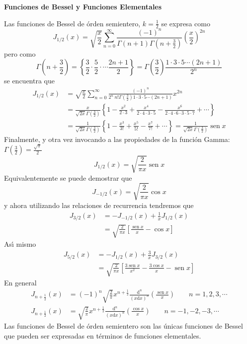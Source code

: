 \documentclass[spanish,notitlepage,letterpaper,12pt]{article}
\begin{document}
\begin{center}
\textbf{Funciones de Bessel y Funciones Elementales}
\end{center}

Las funciones de Bessel de \'{o}rden semientero, $k=\frac12$ se expresa como
\[
J_{1/2}(x)=\sqrt{\frac x2}\sum_{n=0}^{\infty}\frac{\left(  -1\right)  ^{n}%
}{\Gamma\left(  n+1\right)  \Gamma\left(  n+\frac32\right)  }\left(  \frac
x2\right)  ^{2n}
\]
pero como
\[
\Gamma\left(  n+\frac32\right)  =\left\{  \frac32\cdot\frac52\cdot\cdots
\frac{2n+1}2\right\}  =\Gamma\left(  \frac32\right)  \frac{1\cdot3\cdot
5\cdots\left(  2n+1\right)  }{2^{n}}
\]
se encuentra que
\begin{align*}
J_{1/2}(x)  & =\sqrt{\frac x2}\sum_{n=0}^{\infty}\frac{\left(  -1\right)
^{n}}{2^{n}\ n!\Gamma\left(  \frac32\right)  1\cdot3\cdot5\cdots\left(
2n+1\right)  }x^{2n}\\
& =\frac x{\sqrt{2x}\Gamma\left(  \frac32\right)  }\left\{  1-\frac{x^{2}%
}{2\cdot3}+\frac{x^{4}}{2\cdot4\cdot3\cdot5}-\frac{x^{6}}{2\cdot4\cdot
6\cdot3\cdot5\cdot7}+\cdots\right\} \\
& =\frac1{\sqrt{2x}\Gamma\left(  \frac32\right)  }\left\{  1-\frac{x^{3}}%
{3!}+\frac{x^{5}}{5!}-\frac{x^{7}}{7!}+\cdots\right\}  =\frac1{\sqrt{2x}%
\Gamma\left(  \frac32\right)  }\operatorname*{sen}x
\end{align*}
Finalmente, y otra vez invocando a las propiedades de la funci\'{o}n Gamma:
$\Gamma\left(  \frac32\right)  =\frac{\sqrt{\pi}}2$%
\[
J_{1/2}(x)=\sqrt{\frac2{\pi x}}\operatorname*{sen}x
\]
Equivalentemente se puede demostrar que
\[
J_{-1/2}(x)=\sqrt{\frac2{\pi x}}\cos x
\]
y ahora utilizando las relaciones de recurrencia tendremos que
\begin{align*}
J_{3/2}(x)  & =-J_{-1/2}(x)+\frac1xJ_{1/2}(x)\\
& =\sqrt{\frac2{\pi x}}\left[  \frac{\operatorname*{sen}x}x-\cos x\right]
\end{align*}
As\'{\i} mismo
\begin{align*}
J_{5/2}(x)  & =-J_{1/2}(x)+\frac3xJ_{3/2}(x)\\
& =\sqrt{\frac2{\pi x}}\left[  \frac{3\operatorname*{sen}x}{x^{2}}-\frac{3\cos
x}x-\operatorname*{sen}x\right]
\end{align*}
En general
\begin{align*}
J_{n+\frac12}(x)  & =\left(  -1\right)  ^{n}\sqrt{\frac2\pi}x^{n+\frac12}%
\frac{\mathrm{d}^{n}}{\left(  x\mathrm{d}x\right)  ^{n}}\left(  \frac
{\operatorname*{sen}x}x\right)  \qquad n=1,2,3,\cdots\\
J_{n+\frac12}(x)  & =\sqrt{\frac2\pi}x^{n+\frac12}\frac{\mathrm{d}^{n}%
}{\left(  x\mathrm{d}x\right)  ^{n}}\left(  \frac{\cos x}x\right)  \qquad
n=-1,-2,-3,\cdots
\end{align*}
Las funciones de Bessel de \'{o}rden semientero son las \'{u}nicas funciones
de Bessel que pueden ser expresadas en t\'{e}rminos de funciones elementales.
\end{document}
